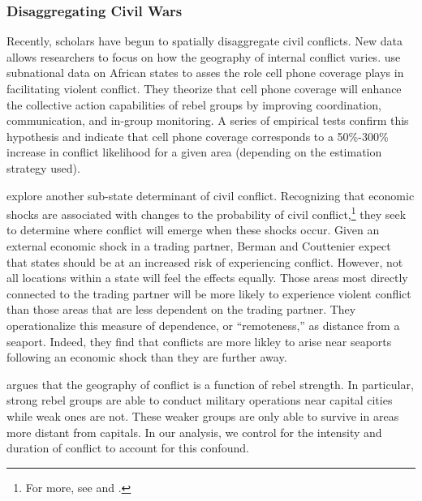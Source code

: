 \subsubsection{Disaggregating Civil Wars}

Recently, scholars have begun to spatially disaggregate civil conflicts. New data allows researchers to focus on how the geography of internal conflict varies. \cite{pierskalla:hollenbach:2013} use subnational data on African states to asses the role cell phone coverage plays in facilitating violent conflict. They theorize that cell phone coverage will enhance the collective action capabilities of rebel groups by improving coordination, communication, and in-group monitoring. A series of empirical tests confirm this hypothesis and indicate that cell phone coverage corresponds to a 50\%-300\% increase in conflict likelihood for a given area (depending on the estimation strategy used).

\cite{berman:couttenier:2013} explore another sub-state determinant of civil conflict. Recognizing that economic shocks are associated with changes to the probability of civil conflict,\footnote{For more, see \cite{miguel:etal:2004} and \cite{dube:vargas:2013}.} they seek to determine where conflict will emerge when these shocks occur. Given an external economic shock in a trading partner, Berman and Couttenier expect that states should be at an increased risk of experiencing conflict. However, not all locations within a state will feel the effects equally. Those areas most directly connected to the trading partner will be more likely to experience violent conflict than those areas that are less dependent on the trading partner. They operationalize this measure of dependence, or ``remoteness,'' as distance from a seaport. Indeed, they find that conflicts are more likley to arise near seaports following an economic shock than they are further away.

\cite{buhaug:2010} argues that the geography of conflict is a function of rebel strength. In particular, strong rebel groups are able to conduct military operations near capital cities while weak ones are not. These weaker groups are only able to survive in areas more distant from capitals. In our analysis, we control for the intensity and duration of conflict to account for this confound.